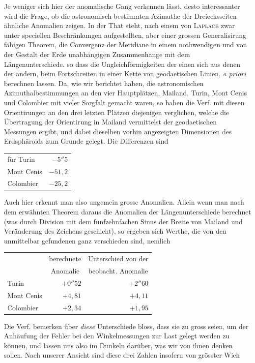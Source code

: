 %
\hspace*{\parindent}Je weniger sich hier der anomalische Gang verkennen lässt, desto interessanter wird die Frage, ob die astronomisch bestimmten Azimuthe der Dreiecksseiten ähnliche Anomalien zeigen. In der That steht, nach einem von \textsc{Laplace} zwar unter speciellen Beschränkungen aufgestellten, aber einer grossen Generalisirung fähigen Theorem, die Convergenz der Meridiane in einem nothwendigen und von der Gestalt der Erde unabhängigen Zusammenhange mit dem Längenunterschiede. so dass die Ungleichförmigkeiten der einen sich aus denen der andern, beim Fortschreiten in einer Kette von geodaetischen Linien, \textit{a priori} berechnen lassen. Da, wie wir berichtet haben, die astronomischen Azimuthalbestimmungen an den vier Hauptplätzen, Mailand, Turin, Mont Cenis und Colombier mit vieler Sorgfalt gemacht waren, so haben die Verf. mit diesen Orientirungen an den drei letzten Plätzen diejenigen verglichen, welche die Übertragung der Orientirung in Mailand vermittelst der geodaetischen Messungen ergibt, und dabei dieselben vorhin angezeigten Dimensionen des Erdsphäroids zum Grunde gelegt. Die Differenzen sind
\begin{center}\begin{tabular}{lr}
für Turin & \(-5''5\)\\
Mont Cenis & \(-51,2\)\\
Colombier & \(-25,2\)
\end{tabular}\end{center}
Auch hier erkennt man also ungemein grosse Anomalien. Allein wenn man nach dem erwähnten Theorem daraus die Anomalien der Längenunterschiede berechnet (was durch Division mit dem funfzehnfachen Sinus der Breite von Mailand und Veränderung des Zeichens geschieht), so ergeben sich Werthe, die von den unmittelbar gefundenen ganz verschieden sind, nemlich
\begin{center}\begin{tabular}{l|r|r}
& \multicolumn{1}{c|}{berechnete} & \multicolumn{1}{c}{Unterschied von der}\\
& \multicolumn{1}{c|}{Anomalie} & \multicolumn{1}{c}{beobacht. Anomalie}\\
Turin & \(+0''52\) & \(+2''60\)\\
Mont Cenis & \(+4,81\) & \(+4,11\)\\
Colombier & \(+2,34\) & \(+1,95\)
\end{tabular}\end{center}
Die Verf. bemerken über \textit{diese} Unterschiede bloss, dass sie zu gross seien, um der Anhäufung der Fehler bei den Winkelmessungen zur Last gelegt werden zu können, und lassen uns also im Dunkeln darüber, was wir von ihnen denken sollen. Nach unserer Ansicht sind diese drei Zahlen insofern von grösster Wich%
